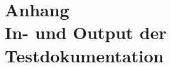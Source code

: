 \addtocounter{chapter}{1}
\chapter*{Anhang \thechapter\\[1.2cm] In- und Output der Testdokumentation}
\label{InOutput}
